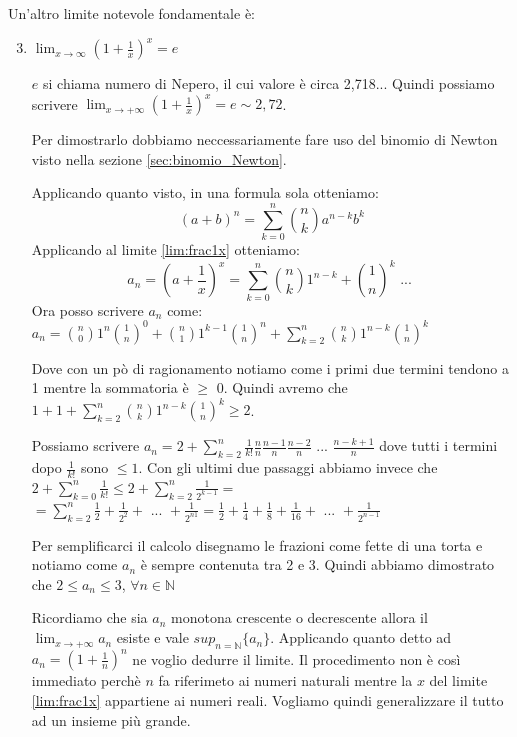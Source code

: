 Un'altro limite notevole fondamentale è:
\begin{enumerate}[label=\textbf{\arabic*})]\setcounter{enumi}{2}
    \item \label{lim:frac1x} $\lim_{x\to\infty} (1+\frac{1}{x})^{x}=e$
    
    $e$ si chiama numero di Nepero, il cui valore è circa 2,718...
    Quindi possiamo scrivere $\lim_{x\to+\infty} (1+\frac{1}{x})^{x}=e\sim 2,72$.
    \begin{dimostration}
    Per dimostrarlo dobbiamo neccessariamente fare uso del binomio di Newton visto nella sezione \ref{sec:binomio_Newton}.
    
    Applicando quanto visto, in una formula sola otteniamo:
    \begin{equation*}
        (a+b)^n=\sum_{k=0}^n\binom{n}{k}a^{n-k}b^k
    \end{equation*}
    Applicando al limite \ref{lim:frac1x} otteniamo:
    \begin{equation}
        a_n=(a+\frac{1}{x})^x=\sum_{k=0}^n\binom{n}{k}1^{n-k}+\binom{1}{n}^k\text{ ... }
    \end{equation}
    Ora posso scrivere $a_n$ come: $a_n=\binom{n}{0}1^n\binom{1}{n}^0+\binom{n}{1}1^{k-1}\binom{1}{n}^n+\sum_{k=2}^n\binom{n}{k}1^{n-k}\binom{1}{n}^k$
    
    Dove con un pò di ragionamento notiamo come i primi due termini tendono a 1 mentre la sommatoria è $\geq$ 0.
    Quindi avremo che $1+1+\sum_{k=2}^n\binom{n}{k}1^{n-k}\binom{1}{n}^k\geq 2$.
    
    Possiamo scrivere $a_n=2+\sum_{k=2}^n\frac{1}{k!}\frac{n}{n}\frac{n-1}{n}\frac{n-2}{n}\text{ ... }\frac{n-k+1}{n}$ dove tutti i termini dopo $\frac{1}{k!}$ sono $\leq 1$.
    Con gli ultimi due passaggi abbiamo invece che $2+\sum_{k=0}^n\frac{1}{k!}\leq 2+\sum_{k=2}^n\frac{1}{2^{k-1}}=$\\
    $=\sum_{k=2}^n\frac{1}{2}+\frac{1}{2^2}+\text{ ... }+\frac{1}{2^{n1}}=\frac{1}{2}+\frac{1}{4}+\frac{1}{8}+\frac{1}{16}+\text{ ... }+\frac{1}{2^{n-1}}$
    
    Per semplificarci il calcolo disegnamo le frazioni come fette di una torta e notiamo come $a_n$ è sempre contenuta tra 2 e 3.
    Quindi abbiamo dimostrato che $2\leq a_n\leq 3$, $\forall n\in\mathbb{N}$
    
    Ricordiamo che sia $a_n$ monotona crescente o decrescente allora il $\lim_{x\to+\infty}a_n$ esiste e vale $sup_{n=\mathbb{N}}\{a_n\}$. Applicando quanto detto ad $a_n=(1+\frac{1}{n})^n$ ne voglio dedurre il limite.
    Il procedimento non è così immediato perchè $n$ fa riferimeto ai numeri naturali mentre la $x$ del limite \ref{lim:frac1x} appartiene ai numeri reali. Vogliamo quindi generalizzare il tutto ad un insieme più grande.
    

\end{dimostration}
\end{enumerate}
